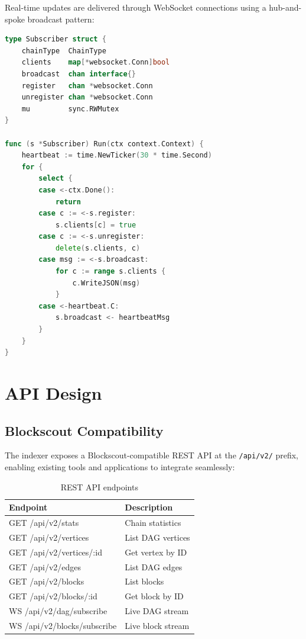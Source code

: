 \documentclass[11pt,twocolumn]{article}
\begin{document}
Real-time updates are delivered through WebSocket connections using a hub-and-spoke broadcast pattern:

\begin{lstlisting}[language=Go,caption={WebSocket subscriber}]
type Subscriber struct {
    chainType  ChainType
    clients    map[*websocket.Conn]bool
    broadcast  chan interface{}
    register   chan *websocket.Conn
    unregister chan *websocket.Conn
    mu         sync.RWMutex
}

func (s *Subscriber) Run(ctx context.Context) {
    heartbeat := time.NewTicker(30 * time.Second)
    for {
        select {
        case <-ctx.Done():
            return
        case c := <-s.register:
            s.clients[c] = true
        case c := <-s.unregister:
            delete(s.clients, c)
        case msg := <-s.broadcast:
            for c := range s.clients {
                c.WriteJSON(msg)
            }
        case <-heartbeat.C:
            s.broadcast <- heartbeatMsg
        }
    }
}
\end{lstlisting}

\section{API Design}

\subsection{Blockscout Compatibility}

The indexer exposes a Blockscout-compatible REST API at the \texttt{/api/v2/} prefix, enabling existing tools and applications to integrate seamlessly:

\begin{table}[h]
\centering
\caption{REST API endpoints}
\begin{tabular}{@{}ll@{}}
\toprule
Endpoint & Description \\
\midrule
GET /api/v2/stats & Chain statistics \\
GET /api/v2/vertices & List DAG vertices \\
GET /api/v2/vertices/:id & Get vertex by ID \\
GET /api/v2/edges & List DAG edges \\
GET /api/v2/blocks & List blocks \\
GET /api/v2/blocks/:id & Get block by ID \\
WS /api/v2/dag/subscribe & Live DAG stream \\
WS /api/v2/blocks/subscribe & Live block stream \\
\bottomrule
\end{tabular}
\label{tab:api-endpoints}
\end{table}
\end{document}
